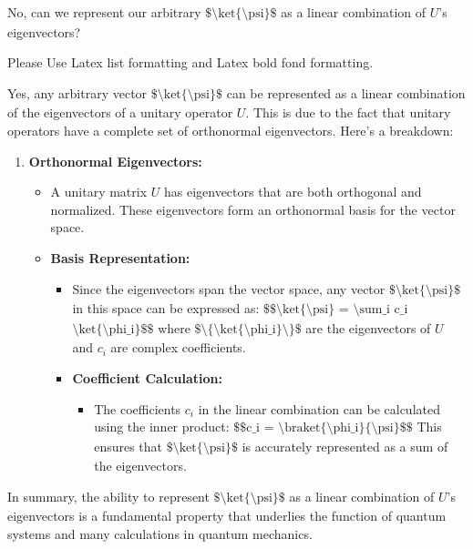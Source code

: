 \begin{ai}
No, can we represent our arbitrary $\ket{\psi}$ as a linear combination of $U$'s eigenvectors?

Please Use Latex list formatting and Latex bold fond formatting.
\end{ai}

\begin{airesult}
Yes, any arbitrary vector \(\ket{\psi}\) can be represented as a linear combination of the
eigenvectors of a unitary operator \(U\). This is due to the fact that unitary operators have a
complete set of orthonormal eigenvectors. Here's a breakdown:

\begin{enumerate}
\item \textbf{Orthonormal Eigenvectors:}
  \begin{itemize}
  \item A unitary matrix \(U\) has eigenvectors that are both orthogonal and normalized. These
eigenvectors form an orthonormal basis for the vector space.

\item \textbf{Basis Representation:}
  \begin{itemize}
  \item Since the eigenvectors span the vector space, any vector \(\ket{\psi}\) in this space can be
expressed as:
    \[
    \ket{\psi} = \sum_i c_i \ket{\phi_i}
    \]
    where \(\{\ket{\phi_i}\}\) are the eigenvectors of \(U\) and \(c_i\) are complex coefficients.

\item \textbf{Coefficient Calculation:}
  \begin{itemize}
  \item The coefficients \(c_i\) in the linear combination can be calculated using the inner
product:
    \[
    c_i = \braket{\phi_i}{\psi}
    \]
    This ensures that \(\ket{\psi}\) is accurately represented as a sum of the eigenvectors.
  \end{itemize}
\end{itemize}

\end{itemize}
\end{enumerate}

In summary, the ability to represent \(\ket{\psi}\) as a linear combination of \(U\)'s eigenvectors
is a fundamental property that underlies the function of quantum systems and many calculations in
quantum mechanics.
\end{airesult}


